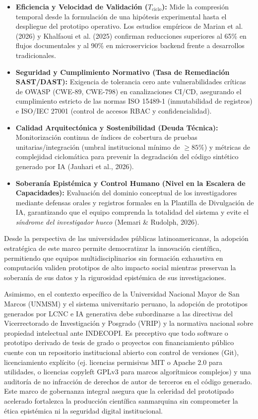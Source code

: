 \begin{itemize}[leftmargin=1.5em]
    \item \textbf{Eficiencia y Velocidad de Validación ($T_{\text{ciclo}}$):} Mide la compresión temporal desde la formulación de una hipótesis experimental hasta el despliegue del prototipo operativo. Los estudios empíricos de Marian et al. (2026) y Khalfaoui et al. (2025) confirman reducciones superiores al 65\% en flujos documentales y al 90\% en microservicios backend frente a desarrollos tradicionales.
    \item \textbf{Seguridad y Cumplimiento Normativo (Tasa de Remediación SAST/DAST):} Exigencia de tolerancia cero ante vulnerabilidades críticas de OWASP (CWE-89, CWE-798) en canalizaciones CI/CD, asegurando el cumplimiento estricto de las normas ISO 15489-1 (inmutabilidad de registros) e ISO/IEC 27001 (control de accesos RBAC y confidencialidad).
    \item \textbf{Calidad Arquitectónica y Sostenibilidad (Deuda Técnica):} Monitorización continua de índices de cobertura de pruebas unitarias/integración (umbral institucional mínimo de $\ge 85\%$) y métricas de complejidad ciclomática para prevenir la degradación del código sintético generado por IA (Jauhari et al., 2026).
    \item \textbf{Soberanía Epistémica y Control Humano (Nivel en la Escalera de Capacidades):} Evaluación del dominio conceptual de los investigadores mediante defensas orales y registros formales en la Plantilla de Divulgación de IA, garantizando que el equipo comprenda la totalidad del sistema y evite el \textit{síndrome del investigador hueco} (Memari \& Rudolph, 2026).
\end{itemize}

Desde la perspectiva de las universidades públicas latinoamericanas, la adopción estratégica de este marco permite democratizar la innovación científica, permitiendo que equipos multidisciplinarios sin formación exhaustiva en computación validen prototipos de alto impacto social mientras preservan la soberanía de sus datos y la rigurosidad epistémica de sus investigaciones.

Asimismo, en el contexto específico de la Universidad Nacional Mayor de San Marcos (UNMSM) y el sistema universitario peruano, la adopción de prototipos generados por LCNC e IA generativa debe subordinarse a las directivas del Vicerrectorado de Investigación y Posgrado (VRIP) y la normativa nacional sobre propiedad intelectual ante INDECOPI. Es preceptivo que todo software o prototipo derivado de tesis de grado o proyectos con financiamiento público cuente con un repositorio institucional abierto con control de versiones (Git), licenciamiento explícito (ej. licencias permisivas MIT o Apache 2.0 para utilidades, o licencias copyleft GPLv3 para marcos algorítmicos complejos) y una auditoría de no infracción de derechos de autor de terceros en el código generado. Este marco de gobernanza integral asegura que la celeridad del prototipado acelerado fortalezca la producción científica sanmarquina sin comprometer la ética epistémica ni la seguridad digital institucional.


